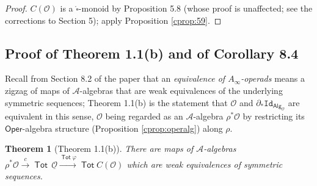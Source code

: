 \documentclass[12pt]{article}
\theoremstyle{plain}
\newtheorem{ctheorem}{Theorem}
\theoremstyle{definition}
\theoremstyle{remark}
\newcommand{\Cal}[1]{\mathcal{#1}}
\newcommand{\Alg}[1]{\mathsf{Alg}_{\mathcal{#1}}}
\newcommand{\Id}{\mathtt{Id}}
\newcommand{\Tot}{\operatorname{\mathsf{Tot}}}
\newcommand{\Oper}{\mathsf{Oper}}
\newcommand{\boxcirc}{\mathring{\square}}
\begin{document}
\begin{proof}
$C(\Cal O)$ is a $\boxcirc$-monoid by Proposition 5.8 (whose proof is unaffected; see the corrections to Section 5); apply Proposition \ref{cprop:59}.
\end{proof}

\subsection{Proof of Theorem 1.1(b) and of Corollary 8.4}
\label{sec:corr:thm1b}

Recall from Section 8.2 of the paper that an \emph{equivalence of $A_\infty$-operads} means a zigzag of maps of $\Cal A$-algebras that are weak equivalences of the underlying symmetric sequences; Theorem 1.1(b) is the statement that $\Cal O$ and $\partial_*\Id_{\Alg{O}}$ are equivalent in this sense, $\Cal O$ being regarded as an $\Cal A$-algebra $\rho^*\Cal O$ by restricting its $\Oper$-algebra structure (Proposition \ref{cprop:operalg}) along $\rho$.

\begin{ctheorem}[Theorem 1.1(b)]\label{cthm:1b}
There are maps of $\Cal A$-algebras $\rho^*\Cal O\xrightarrow{c}\Tot\,\underline{\Cal O}\xrightarrow{\Tot\varphi}\Tot C(\Cal O)$ which are weak equivalences of symmetric sequences.
\end{ctheorem}
\end{document}
